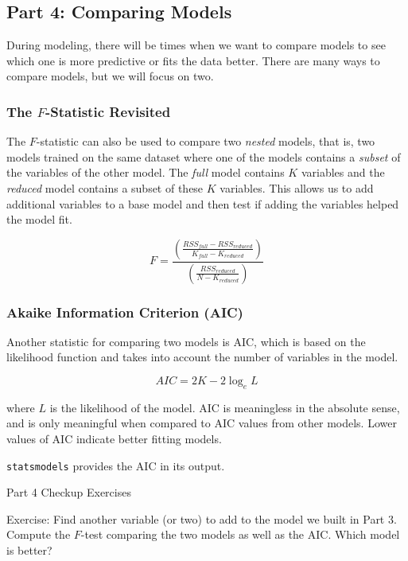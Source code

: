 \documentclass[11pt]{article}
\begin{document}
    \subsection{Part 4: Comparing Models}\label{part-4-comparing-models}

    During modeling, there will be times when we want to compare models to
see which one is more predictive or fits the data better. There are many
ways to compare models, but we will focus on two.

    \subsubsection{\texorpdfstring{The \(F\)-Statistic
Revisited}{The F-Statistic Revisited}}\label{the-f-statistic-revisited}

The \(F\)-statistic can also be used to compare two \emph{nested}
models, that is, two models trained on the same dataset where one of the
models contains a \emph{subset} of the variables of the other model. The
\emph{full} model contains \(K\) variables and the \emph{reduced} model
contains a subset of these \(K\) variables. This allows us to add
additional variables to a base model and then test if adding the
variables helped the model fit.

\[F = \frac{\left( \frac{RSS_{full} - RSS_{reduced}}{K_{full} - K_{reduced}} \right)}{\left( \frac{RSS_{reduced}}{N - K_{reduced}} \right)}\]

    \subsubsection{Akaike Information Criterion
(AIC)}\label{akaike-information-criterion-aic}

Another statistic for comparing two models is AIC, which is based on the
likelihood function and takes into account the number of variables in
the model.

\[AIC = 2 K - 2 \log_e{L}\]

where \(L\) is the likelihood of the model. AIC is meaningless in the
absolute sense, and is only meaningful when compared to AIC values from
other models. Lower values of AIC indicate better fitting models.

\texttt{statsmodels} provides the AIC in its output.

    Part 4 Checkup Exercises

Exercise: Find another variable (or two) to add to the model we built in
Part 3. Compute the \(F\)-test comparing the two models as well as the
AIC. Which model is better?
\end{document}
